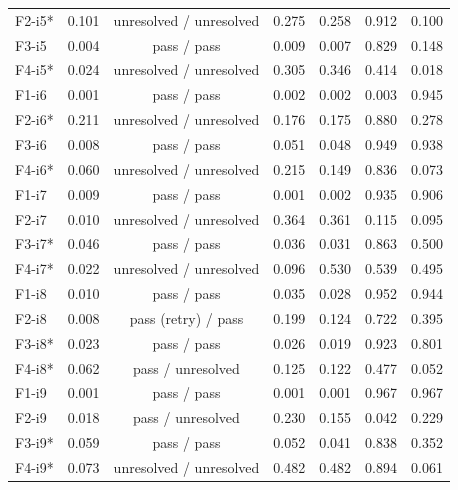 \begin{tabular}{lcccccc}
F2-i5* & 0.101 & unresolved / unresolved & 0.275 & 0.258 & 0.912 & 0.100 \\
F3-i5 & 0.004 & pass / pass & 0.009 & 0.007 & 0.829 & 0.148 \\
F4-i5* & 0.024 & unresolved / unresolved & 0.305 & 0.346 & 0.414 & 0.018 \\
F1-i6 & 0.001 & pass / pass & 0.002 & 0.002 & 0.003 & 0.945 \\
F2-i6* & 0.211 & unresolved / unresolved & 0.176 & 0.175 & 0.880 & 0.278 \\
F3-i6 & 0.008 & pass / pass & 0.051 & 0.048 & 0.949 & 0.938 \\
F4-i6* & 0.060 & unresolved / unresolved & 0.215 & 0.149 & 0.836 & 0.073 \\
F1-i7 & 0.009 & pass / pass & 0.001 & 0.002 & 0.935 & 0.906 \\
F2-i7 & 0.010 & unresolved / unresolved & 0.364 & 0.361 & 0.115 & 0.095 \\
F3-i7* & 0.046 & pass / pass & 0.036 & 0.031 & 0.863 & 0.500 \\
F4-i7* & 0.022 & unresolved / unresolved & 0.096 & 0.530 & 0.539 & 0.495 \\
F1-i8 & 0.010 & pass / pass & 0.035 & 0.028 & 0.952 & 0.944 \\
F2-i8 & 0.008 & pass (retry) / pass & 0.199 & 0.124 & 0.722 & 0.395 \\
F3-i8* & 0.023 & pass / pass & 0.026 & 0.019 & 0.923 & 0.801 \\
F4-i8* & 0.062 & pass / unresolved & 0.125 & 0.122 & 0.477 & 0.052 \\
F1-i9 & 0.001 & pass / pass & 0.001 & 0.001 & 0.967 & 0.967 \\
F2-i9 & 0.018 & pass / unresolved & 0.230 & 0.155 & 0.042 & 0.229 \\
F3-i9* & 0.059 & pass / pass & 0.052 & 0.041 & 0.838 & 0.352 \\
F4-i9* & 0.073 & unresolved / unresolved & 0.482 & 0.482 & 0.894 & 0.061 \\
\bottomrule
\end{tabular}
